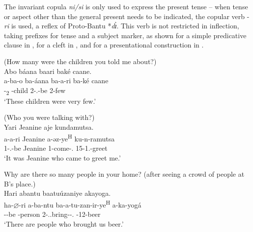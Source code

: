 \documentclass[output=paper]{langscibook}
\begin{document}
\z


The invariant copula \textit{ni/si} is only used to express the present tense – when tense or aspect other than the general present needs to be indicated, the copular verb -\textit{ri} is used, a reflex of Proto-Bantu *\textit{d\`{ɪ}}. This verb is not restricted in inflection, taking prefixes for tense and a subject marker, as shown for a simple predicative clause in , for a cleft in , and for a presentational construction in .

\ea
\label{bkm:Ref75184052}
(How many were the children you told me about?)\\
Abo báana baari baké caane.\\
\gll
a-ba-o  ba-áana  ba-a-ri  ba-ké  caane\\
-\DEM{}\textsubscript{2}  -{}child  2\SM-\N.\PST{}-be  2-few  \INT{}\\
\glt
‘These children were very few.’\\

\z

\ea
\label{bkm:Ref73960454}
(Who you were talking with?)\\
Yari Jeanine aje kundamutsa.\\
\gll
a-a-ri  Jeanine  a-əz-ye\textsuperscript{H}  ku-n-ramutsa\\
1\SM-\N.\PST{}-be  Jeanine  1\SM-{}come-\PFV.\REL{}  15-1\SG.\OM{}-greet\\
\glt
‘It was Jeanine who came to greet me.’\\

\z

\ea
\label{bkm:Ref75184028}
\begin{xlist}
 Why are there so many people in your home? (after seeing a crowd of people at B’s place.)\\
Hari abantu baatuúzaniye akayoga.\\
\gll
ha-$\varnothing$-ri  a-ba-ntu  ba-a-tu-zan-ir-ye\textsuperscript{H}  a-ka-yogá\\
\EXP-\PRS{}-be  -{}person  2\SM-\N.\PL.\OM{}bring-\APPL-\PFV.\REL{}  \AUG{}-12-beer\\
\glt
‘There are people who brought us beer.’\\

\end{xlist}
\z
\end{document}
